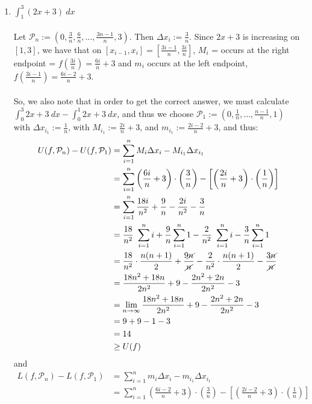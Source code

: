 \documentclass[12pt,letterpaper]{article}
\theoremstyle{case}
\theoremstyle{definition}
\begin{document}
\begin{enumerate}
		\begin{enumerate}
			\item $\displaystyle\int_{1}^{3} (2x+3)\ dx$
			\\\\Let $\mathcal{P}_n :=\left(0, \frac{3}{n}, \frac{6}{n}, \dots,
			 \frac{3n-1}{n}, 3\right)$. Then $\Delta x_i := \frac{3}{n}$. Since $2x+3$ is increasing on $[1,3]$,  we have that on $[x_{i-1},x_i] = \left[\frac{3i-1}{n}, \frac{3i}{n}\right]$, $M_i$ = occurs at the right endpoint = $f(\frac{3i}{n})=\frac{6i}{n} + 3$ and $m_i$ occurs at the left endpoint, $f\left(\frac{3i-1}{n}\right)=\frac{6i-2}{n}+3$.
			 \\\\So, we also note that in order to get the correct answer, we must calculate $\displaystyle\int_{0}^{3} 2x+3\ dx - \int_{0}^{1} 2x+3\ dx$, and thus we choose $\mathcal{P}_1 := \left(0,\frac{1}{n},\dots,\frac{n-1}{n}, 1\right)$ with $\Delta x_{i_1} :=\frac{1}{n}$, with $M_{i_1}:= \frac{2i}{n}+3$, and $m_{i_1}:= \frac{2i-2}{n}+3$, and thus:
			 \begin{align*}
			 	U(f,\mathcal{P}_n)-U(f,\mathcal{P}_1) &= \sum_{i=1}^{n} M_i \Delta x_i - M_{i_1} \Delta x_{i_1} \\
			 	&= \sum_{i=1}^{n} \left(\frac{6i}{n} + 3\right) \cdot \left(\frac{3}{n}\right) - \left[\left(\frac{2i}{n}+3\right)\cdot \left(\frac{1}{n}\right)\right]\\
			 	&= \sum_{i=1}^{n} \frac{18i}{n^2} + \frac{9}{n} -
			 	\frac{2i}{n^2}-\frac{3}{n}\\
			 	&= \frac{18}{n^2}\ \sum_{i=1}^{n} i + \frac{9}{n} \sum_{i=1}^{n} 1 -\frac{2}{n^2}\ \sum_{i=1}^{n} i - \frac{3}{n} \sum_{i=1}^{n} 1\\
			 	&= \frac{18}{n^2} \cdot \frac{n(n+1)}{2} + \frac{9\cancel{n}}{\cancel{n}} -\frac{2}{n^2}\cdot \frac{n(n+1)}{2}-\frac{3\cancel{n}}{\cancel{n}}\\
			 	&= \frac{18n^2+18n}{2n^2} + 9 - \frac{2n^2+2n}{2n^2}-3 \\
			 	&= \lim\limits_{n \to \infty} \frac{18n^2+18n}{2n^2} + 9 - \frac{2n^2+2n}{2n^2}-3 \\
			 	&= 9+9-1-3 \\
			 	&= 14 \\
			 	&\geq U(f)
			 \end{align*}
			 and
			 \begin{align*}
			 	L(f,\mathcal{P}_n)-L(f,\mathcal{P}_1) &= \sum_{i=1}^{n} m_i \Delta x_i -m_{i_1} \Delta x_{i_1}\\
			 	&= \sum_{i=1}^{n} \left(\frac{6i-2}{n}+3\right)\cdot \left(\frac{3}{n}\right) -\left[\left(\frac{2i-2}{n}+3\right)\cdot \left(\frac{1}{n}\right)\right]\\

\end{align*}
\end{enumerate}
\end{enumerate}
\end{document}
